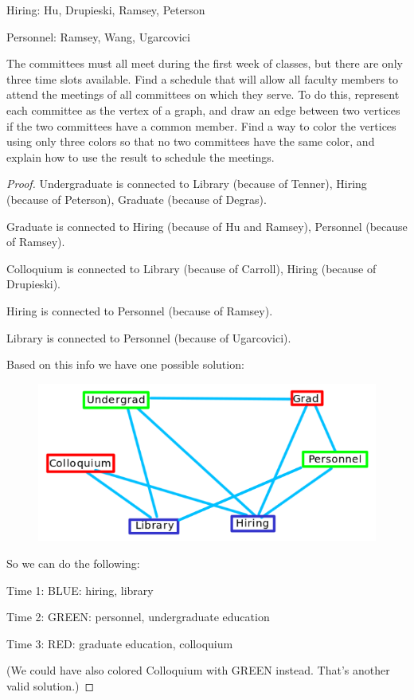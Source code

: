\documentclass[14pt]{extarticle}
\begin{document}
Hiring: Hu, Drupieski, Ramsey, Peterson

Personnel: Ramsey, Wang, Ugarcovici

The committees must all meet during the first week of classes, but there are
only three time slots available. Find a schedule that will allow all faculty
members to attend the meetings of all committees on which they serve. To do
this, represent each committee as the vertex of a graph, and draw an edge
between two vertices if the two committees have a common member. Find a way to
color the vertices using only three colors so that no two committees have the
same color, and explain how to use the result to schedule the meetings.

\begin{proof}
Undergraduate is connected to Library (because of Tenner), Hiring (because of
Peterson), Graduate (because of Degras).

Graduate is connected to Hiring (because of Hu and Ramsey), Personnel (because
of Ramsey).

Colloquium is connected to Library (because of Carroll), Hiring (because of
Drupieski).

Hiring is connected to Personnel (because of Ramsey).

Library is connected to Personnel (because of Ugarcovici).

Based on this info we have one possible solution:
\begin{figure}[ht!]
\centering
\includegraphics[scale=0.5]{../images/1.4.16.sol.png}
\end{figure}

So we can do the following:

Time 1: BLUE: hiring, library

Time 2: GREEN: personnel, undergraduate education

Time 3: RED: graduate education, colloquium

(We could have also colored Colloquium with GREEN instead. That's another
valid solution.)
\end{proof}
\end{document}
